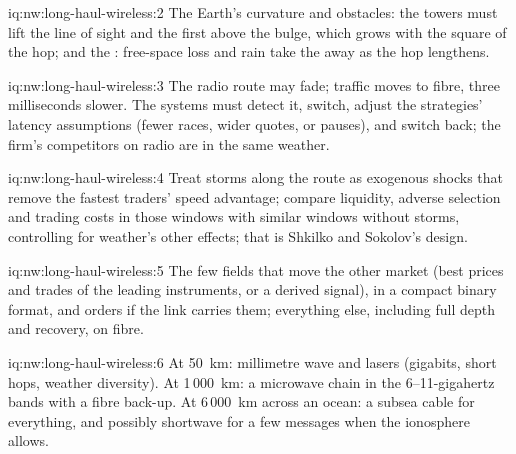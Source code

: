 \begin{solution}{iq:nw:long-haul-wireless:2}
The Earth's curvature and obstacles: the towers must lift the line of sight and the first  above the bulge, which grows with the square of
the hop; and the : free-space loss and rain take the  away as the hop lengthens.
\end{solution}

\begin{solution}{iq:nw:long-haul-wireless:3}
The radio route may fade; traffic moves to fibre, three milliseconds slower. The systems must detect it, switch, adjust the strategies'
latency assumptions (fewer races, wider quotes, or pauses), and switch back; the firm's competitors on radio are in the same weather.
\end{solution}

\begin{solution}{iq:nw:long-haul-wireless:4}
Treat storms along the route as exogenous shocks that remove the fastest traders' speed advantage; compare liquidity, adverse selection and
trading costs in those windows with similar windows without storms, controlling for weather's other effects; that is Shkilko and Sokolov's design.
\end{solution}

\begin{solution}{iq:nw:long-haul-wireless:5}
The few fields that move the other market (best prices and trades of the leading instruments, or a derived signal), in a compact binary format,
and orders if the link carries them; everything else, including full depth and recovery, on fibre.
\end{solution}

\begin{solution}{iq:nw:long-haul-wireless:6}
At 50~km: millimetre wave and lasers (gigabits, short hops, weather diversity). At 1\,000~km: a microwave chain in the 6--11-gigahertz bands with a
fibre back-up. At 6\,000~km across an ocean: a subsea cable for everything, and possibly shortwave for a few messages when the ionosphere allows.
\end{solution}
